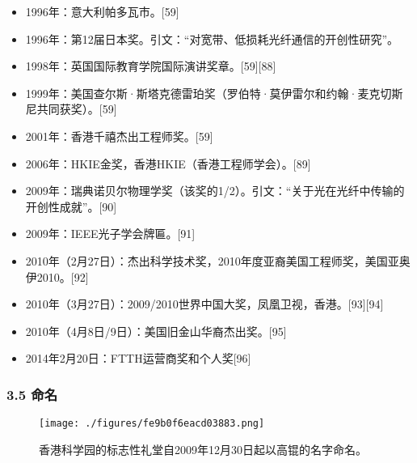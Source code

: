 \begin{itemize}
\item 1996年：意大利帕多瓦市。[59]
\item 1996年：第12届日本奖。引文：“对宽带、低损耗光纤通信的开创性研究”。
\item 1998年：英国国际教育学院国际演讲奖章。[59][88]
\item 1999年：美国查尔斯·斯塔克德雷珀奖（罗伯特·莫伊雷尔和约翰·麦克切斯尼共同获奖）。[59]
\item 2001年：香港千禧杰出工程师奖。[59]
\item 2006年：HKIE金奖，香港HKIE（香港工程师学会）。[89]
\item 2009年：瑞典诺贝尔物理学奖（该奖的1/2）。引文：“关于光在光纤中传输的开创性成就”。[90]
\item 2009年：IEEE光子学会牌匾。[91]
\item 2010年（2月27日）：杰出科学技术奖，2010年度亚裔美国工程师奖，美国亚奥伊2010。[92]
\item 2010年（3月27日）：2009/2010世界中国大奖，凤凰卫视，香港。[93][94]
\item 2010年（4月8日/9日）：美国旧金山华裔杰出奖。[95]
\item 2014年2月20日：FTTH运营商奖和个人奖[96]
\end{itemize}

\subsubsection{3.5 命名}
\begin{figure}[ht]
\centering
\texttt{[image: ./figures/fe9b0f6eacd03883.png]}
\caption{香港科学园的标志性礼堂自2009年12月30日起以高锟的名字命名。} \label{fig_GK_4}
\end{figure}
\be